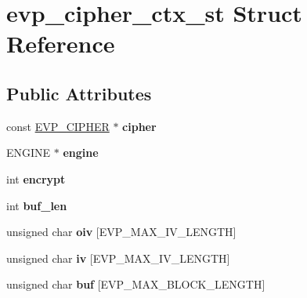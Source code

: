 \hypertarget{structevp__cipher__ctx__st}{}\section{evp\+\_\+cipher\+\_\+ctx\+\_\+st Struct Reference}
\label{structevp__cipher__ctx__st}
\subsection*{Public Attributes}
\begin{DoxyCompactItemize}
\item 
\mbox{\label{structevp__cipher__ctx__st_a54860c2aa28ae69bff3ada58996b4bc3}} 
const \hyperlink{structevp__cipher__st}{E\+V\+P\+\_\+\+C\+I\+P\+H\+ER} $\ast$ {\bfseries cipher}
\item 
\mbox{\label{structevp__cipher__ctx__st_a1ab6fb61a2574c641f9498c8731715d3}} 
E\+N\+G\+I\+NE $\ast$ {\bfseries engine}
\item 
\mbox{\label{structevp__cipher__ctx__st_ad6b7abc39f975d0d324be0fef7665cc6}} 
int {\bfseries encrypt}
\item 
\mbox{\label{structevp__cipher__ctx__st_abf70e5abfb9df24c74ad2297c7d53ae0}} 
int {\bfseries buf\+\_\+len}
\item 
\mbox{\label{structevp__cipher__ctx__st_a9b3a75184a5f5d29fbccf925503fe302}} 
unsigned char {\bfseries oiv} \mbox{[}E\+V\+P\+\_\+\+M\+A\+X\+\_\+\+I\+V\+\_\+\+L\+E\+N\+G\+TH\mbox{]}
\item 
\mbox{\label{structevp__cipher__ctx__st_a1b3aa9f85ae704113077fb77b5c9db8b}} 
unsigned char {\bfseries iv} \mbox{[}E\+V\+P\+\_\+\+M\+A\+X\+\_\+\+I\+V\+\_\+\+L\+E\+N\+G\+TH\mbox{]}
\item 
\mbox{\label{structevp__cipher__ctx__st_a433caab60fc2419a460e4006b0734352}} 
unsigned char {\bfseries buf} \mbox{[}E\+V\+P\+\_\+\+M\+A\+X\+\_\+\+B\+L\+O\+C\+K\+\_\+\+L\+E\+N\+G\+TH\mbox{]}
\item 
\mbox{\label{structevp__cipher__ctx__st_ae09b6c40179528583d8d7b3cc623bd87}} 

\end{DoxyCompactItemize}
